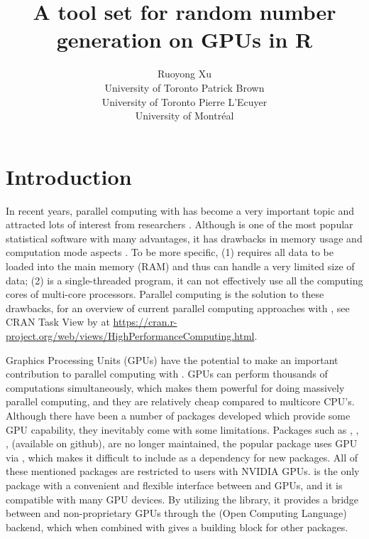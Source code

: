 \documentclass[article,nojss]{jss}\usepackage[]{graphicx}\usepackage[]{color}
\author{Ruoyong Xu\\University of Toronto
   \And Patrick Brown\\University of Toronto
   \And Pierre L’Ecuyer\\University of Montr\'eal}
\title{A tool set for random number generation on GPUs in R}
\begin{document}





\section[Introduction]{Introduction}

% 

In recent years, parallel computing with  \citep{r2021} has become a very important topic and attracted lots of interest from researchers \citep[see][for a review]{eddelbuettel2021parallel}. Although  is one of the most popular statistical software with many advantages, it has drawbacks in memory usage and computation mode aspects \citep{zhao_2016}. To be more specific, (1)  requires all data to be loaded into the main memory (RAM) and thus can handle a very limited size of data; (2)  is a single-threaded program, it can not effectively use all the computing cores of multi-core processors. Parallel computing is the solution to these drawbacks, for an overview of current parallel computing approaches with , see CRAN Task View by \citet{cran2021} at \url{https://cran.r-project.org/web/views/HighPerformanceComputing.html}. 

Graphics Processing Units (GPUs) have the potential to make an important contribution to parallel computing with . GPUs can perform thousands of computations simultaneously, which makes them powerful for doing massively parallel computing, and they are relatively cheap compared to multicore CPU's. Although there have been a number of  packages developed which provide some GPU capability, they inevitably come with some limitations. Packages such as , , ,  (available on github), are no longer maintained, the popular  \citep{tensorflow1} package uses GPU via , which makes it difficult to include as a dependency for new  packages. All of these mentioned packages are restricted to  users with NVIDIA GPUs.  \citep{gpur1} is the only  package with a convenient and flexible interface between  and GPUs, and it is compatible with many GPU devices. By utilizing the  \citep*{rupp2016viennacl} library, it provides a bridge between  and non-proprietary GPUs through the  (Open Computing Language) backend, which when combined with  \citep{rcpp1} gives a building block for other  packages. 
\end{document}
